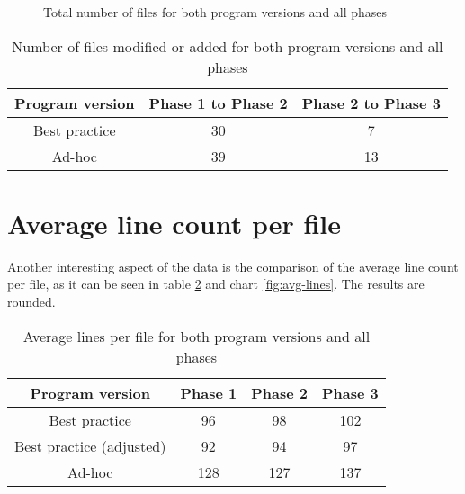 \begin{figure}
	\centering

	\caption{Total number of files for both program versions and all phases}
	\label{fig:files}
\end{figure}

 \begin{table}
 	\centering

 	\begin{tabular}{|c|c|c|} \hline
 		\textbf{Program version} &\textbf{Phase 1 to Phase 2} & \textbf{Phase 2 to Phase 3} \\ \hline
 		Best practice & 30 & 7 \\ \hline
 		Ad-hoc & 39 & 13\\ \hline
 	\end{tabular}
 	\caption{Number of files modified or added for both program versions and all phases} 	\label{table:touched-files}
 \end{table}

\section{Average line count per file}
\label{sec:avg-line-count}
Another interesting aspect of the data is the comparison of the average line count per file, as it can be seen in table \ref{table:avg-lines} and chart \ref{fig:avg-lines}. The results are rounded.

\begin{table}
	\centering

	\begin{tabular}{|c|c|c|c|} \hline
		\textbf{Program version} &\textbf{Phase 1} & \textbf{Phase 2} & \textbf{Phase 3} \\ \hline
		Best practice & 96 & 98 & 102 \\ \hline
		Best practice (adjusted) & 92 & 94 & 97\\ \hline
		Ad-hoc & 128 & 127 & 137 \\ \hline
	\end{tabular}
	\caption{Average lines per file for both program versions and all phases}
	\label{table:avg-lines}
\end{table}

